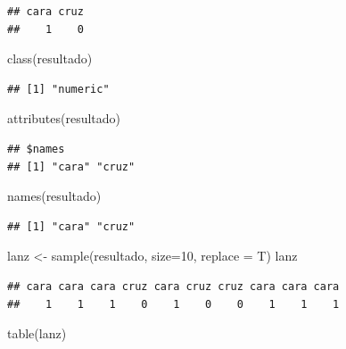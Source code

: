 \documentclass[
]{book}
\newenvironment{Shaded}{\begin{snugshade}}{\end{snugshade}}
\newcommand{\AttributeTok}[1]{\textcolor[rgb]{0.77,0.63,0.00}{#1}}
\newcommand{\DecValTok}[1]{\textcolor[rgb]{0.00,0.00,0.81}{#1}}
\newcommand{\FunctionTok}[1]{\textcolor[rgb]{0.00,0.00,0.00}{#1}}
\newcommand{\NormalTok}[1]{#1}
\newcommand{\OtherTok}[1]{\textcolor[rgb]{0.56,0.35,0.01}{#1}}
\theoremstyle{break}
\theoremstyle{nonumberplain}
\begin{document}
\begin{verbatim}
## cara cruz 
##    1    0
\end{verbatim}

\begin{Shaded}
\begin{Highlighting}[]
\FunctionTok{class}\NormalTok{(resultado)}
\end{Highlighting}
\end{Shaded}

\begin{verbatim}
## [1] "numeric"
\end{verbatim}

\begin{Shaded}
\begin{Highlighting}[]
\FunctionTok{attributes}\NormalTok{(resultado)}
\end{Highlighting}
\end{Shaded}

\begin{verbatim}
## $names
## [1] "cara" "cruz"
\end{verbatim}

\begin{Shaded}
\begin{Highlighting}[]
\FunctionTok{names}\NormalTok{(resultado)}
\end{Highlighting}
\end{Shaded}

\begin{verbatim}
## [1] "cara" "cruz"
\end{verbatim}

\begin{Shaded}
\begin{Highlighting}[]
\NormalTok{lanz }\OtherTok{\textless{}{-}} \FunctionTok{sample}\NormalTok{(resultado, }\AttributeTok{size=}\DecValTok{10}\NormalTok{, }\AttributeTok{replace =}\NormalTok{ T)}
\NormalTok{lanz}
\end{Highlighting}
\end{Shaded}

\begin{verbatim}
## cara cara cara cruz cara cruz cruz cara cara cara 
##    1    1    1    0    1    0    0    1    1    1
\end{verbatim}

\begin{Shaded}
\begin{Highlighting}[]
\FunctionTok{table}\NormalTok{(lanz)}
\end{Highlighting}
\end{Shaded}
\end{document}
